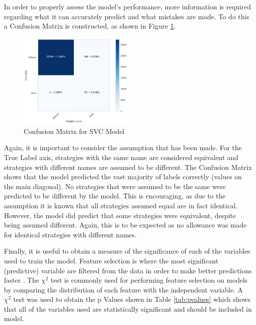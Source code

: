 In order to properly assess the model's performance, more information is required regarding what it can accurately predict and what mistakes are made.
To do this a Confusion Matrix is constructed, as shown in Figure \ref{fig:conf_matrix}.

\begin{figure}[htbp!]
    \centering
    \includegraphics[width=0.5\textwidth]{../img/ML/confusion_matrix.png}
    \caption{Confusion Matrix for SVC Model}
    \label{fig:conf_matrix}
\end{figure}

Again, it is important to consider the assumption that has been made.
For the True Label axis, strategies with the same name are considered equivalent and strategies with different names are assumed to be different.
The Confusion Matrix shows that the model predicted the vast majority of labels correctly (values on the main diagonal).
No strategies that were assumed to be the same were predicted to be different by the model.
This is encouraging, as due to the assumption it is known that all strategies assumed equal are in fact identical.
However, the model did predict that some strategies were equivalent, despite being assumed different.
Again, this is to be expected as no allowance was made for identical strategies with different names.

Finally, it is useful to obtain a measure of the significance of each of the variables used to train the model.
Feature selection is where the most significant (predictive) variable are filtered from the data in order to make better predictions faster \cite{Guyon2003}.
The $\chi^2$ test is commonly used for performing feature selection on models \cite{Forman2003} by comparing the distribution of each feature with the independent variable.
A $\chi^2$ test was used to obtain the p Values shown in Table \ref{tab:pvalues} which shows that all of the variables used are statistically significant and should be included in model.

